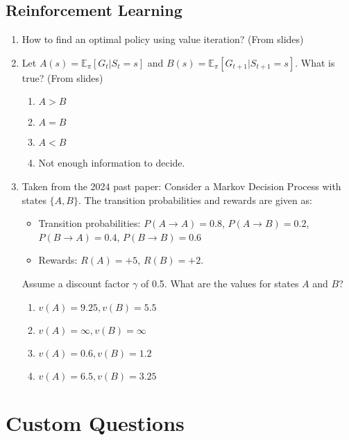 \documentclass{report}
\numberwithin{equation}{section}
\begin{document}
\section{Reinforcement Learning}
\begin{enumerate}
    \item How to find an optimal policy using value iteration? (From slides)\\
       
    \item Let \(A(s) = \mathbb{E}_{\pi}[G_t | S_t = s]\) and \(B(s) = \mathbb{E}_{\pi}[G_{t+1} | S_{t+1} = s]\). What is true? (From slides)
    \begin{enumerate}[label=\alph*.]
    \item  \(A>B\) 
    \item \(A = B\)
    \item \(A < B\)
    \item Not enough information to decide. \newline


\end{enumerate}
\item Taken from the 2024 past paper: 
Consider a Markov Decision Process with states \( \{A, B\} \). The transition probabilities and rewards are given as:

\begin{itemize}
\item Transition probabilities: \( P(A \rightarrow A) = 0.8 \), \( P(A \rightarrow B) = 0.2 \), \( P(B \rightarrow A) = 0.4 \), \( P(B \rightarrow B) = 0.6 \)
\item Rewards: \( R(A) = +5 \), \( R(B) = +2 \).
\end{itemize}

Assume a discount factor \( \gamma \) of 0.5. What are the values for states \( A \) and \( B \)?
\begin{enumerate}[label=\alph*.]
    \item \( v(A)=9.25, v(B)=5.5 \)    
    \item \( v(A)=\infty, v(B)=\infty \)
    \item \( v(A)=0.6, v(B)=1.2 \)
    \item \( v(A)=6.5, v(B)=3.25 \)
\end{enumerate}

\end{enumerate}

\chapter{Custom Questions}
\end{document}
